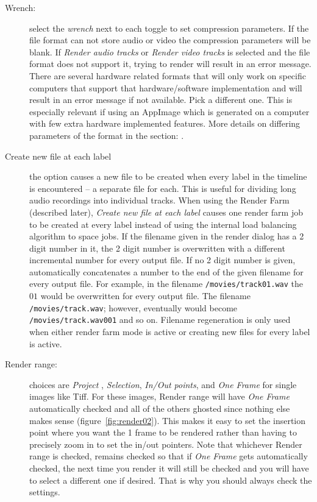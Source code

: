 \begin{description}
\item[Wrench:]  select the \textit{wrench} next to each toggle to set
  compression parameters.  If the file format can not store audio or
  video the compression parameters will be blank.  If \textit{Render
    audio tracks} or \textit{Render video tracks} is selected and the
  file format does not support it, trying to render will result in an
  error message. There are several hardware related formats that will
  only work on specific computers that support that hardware/software
  implementation and will result in an error message if not available.
  Pick a different one.  This is especially relevant if using an AppImage
  which is generated on a computer with few extra hardware implemented
  features.
More details on differing parameters of the format in the section:
  .
\item[Create new file at each label] the option causes a new file to
  be created when every label in the timeline is encountered – a
  separate file for each.  This is useful for dividing long audio
  recordings into individual tracks.  When using the Render Farm
  (described later), \textit{Create new file at each label} causes one
  render farm job to be created at every label instead of using the
  internal load balancing algorithm to space jobs.  If the filename
  given in the render dialog has a 2 digit number in it, the 2 digit
  number is overwritten with a different incremental number for every
  output file. If no 2 digit number is given, \CGG{} automatically
  concatenates a number to the end of the given filename for every
  output file.  For example, in the filename
  \texttt{/movies/track01.wav} the $01$ would be overwritten for every
  output file.  The filename \texttt{/movies/track.wav}; however,
  eventually would become \texttt{/movies/track.wav001} and so on.
  Filename regeneration is only used when either render farm mode is
  active or creating new files for every label is active.
\item[Render range:]  choices are \textit{Project} ,
  \textit{Selection}, \textit{In/Out points}, and \textit{One Frame}
  for single images like Tiff.  For these images, Render range will
  have \textit{One Frame} automatically checked and all of the others
  ghosted since nothing else makes sense (figure~\ref{fig:render02}).
  This makes it easy to set the insertion point where you want the 1
  frame to be rendered rather than having to precisely zoom in to set
  the in/out pointers.  Note that whichever Render range is checked,
  remains checked so that if \textit{One Frame} gets automatically
  checked, the next time you render it will still be checked and you
  will have to select a different one if desired.  That is why you
  should always check the settings.
\end{description}

